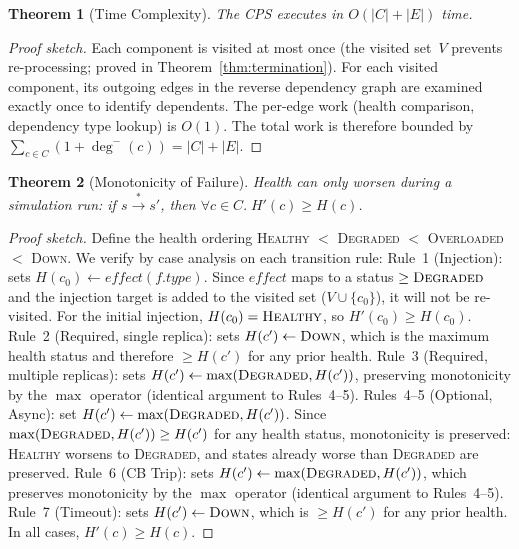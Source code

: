 \documentclass[10pt,twocolumn]{article}
\newtheorem{theorem}{Theorem}
\begin{document}
\begin{theorem}[Time Complexity]\label{thm:complexity}
The CPS executes in $O(|C| + |E|)$ time.
\end{theorem}
\begin{proof}[Proof sketch]
Each component is visited at most once (the visited set~$V$ prevents
re-processing; proved in Theorem~\ref{thm:termination}). For each
visited component, its outgoing edges in the reverse dependency graph
are examined exactly once to identify dependents. The per-edge work
(health comparison, dependency type lookup) is $O(1)$. The total work
is therefore bounded by $\sum_{c \in C} (1 + \deg^{-}(c)) = |C| + |E|$.
\end{proof}

\begin{theorem}[Monotonicity of Failure]\label{thm:monotonicity}
Health can only worsen during a simulation run:
if $s \xrightarrow{*} s'$, then $\forall c \in C.\; H'(c) \ge H(c)$.
\end{theorem}
\begin{proof}[Proof sketch]
Define the health ordering \textsc{Healthy} $<$ \textsc{Degraded} $<$
\textsc{Overloaded} $<$ \textsc{Down}. We verify by case analysis on
each transition rule:
Rule~1 (Injection): sets $H(c_0) \leftarrow \mathit{effect}(f.\mathit{type})$.
Since $\mathit{effect}$ maps to a status $\ge \textsc{Degraded}$ and
the injection target is added to the visited set ($V \cup \{c_0\}$),
it will not be re-visited. For the initial injection,
$H(c_0) = \textsc{Healthy}$, so $H'(c_0) \ge H(c_0)$.
Rule~2 (Required, single replica): sets $H(c') \leftarrow \textsc{Down}$,
which is the maximum health status and therefore $\ge H(c')$ for any
prior health.
Rule~3 (Required, multiple replicas): sets
$H(c') \leftarrow \max(\textsc{Degraded}, H(c'))$, preserving
monotonicity by the $\max$ operator (identical argument to
Rules~4--5).
Rules~4--5 (Optional, Async): set $H(c') \leftarrow \max(\textsc{Degraded},
H(c'))$. Since $\max(\textsc{Degraded}, H(c')) \ge H(c')$ for any
health status, monotonicity is preserved: \textsc{Healthy} worsens to
\textsc{Degraded}, and states already worse than \textsc{Degraded} are
preserved.
Rule~6 (CB Trip): sets $H(c') \leftarrow \max(\textsc{Degraded}, H(c'))$,
which preserves monotonicity by the $\max$ operator (identical argument
to Rules~4--5).
Rule~7 (Timeout): sets $H(c') \leftarrow \textsc{Down}$, which is
$\ge H(c')$ for any prior health.
In all cases, $H'(c) \ge H(c)$.
\end{proof}
\end{document}
